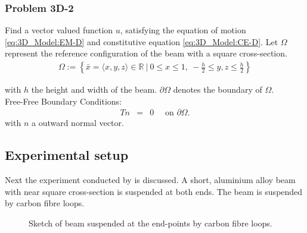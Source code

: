 \documentclass[../../main.tex]{subfiles}
\begin{document}
\subsubsection{Problem 3D-2}
Find a vector valued function $u$, satisfying the equation of motion \eqref{eq:3D_Model:EM-D} and constitutive equation \eqref{eq:3D_Model:CE-D}. Let $\Omega$ represent the reference configuration of the beam with a square cross-section.
\begin{eqnarray*}
	\Omega := \left\{ \bar{x} = \langle x,y,z \rangle \in \mathbb{R} \ | \ 0 \leq x \leq 1, \ -\frac{h}{2} \leq y, z \leq \frac{h}{2}  \right\}
\end{eqnarray*}

with $h$ the height and width of the beam. $\partial \Omega$ denotes the boundary of $\Omega$. \label{sym:height} \\

{Free-Free Boundary Conditions:}\\
\begin{eqnarray*}
	Tn & = & 0 \quad \textrm{ on } \partial\Omega.
\end{eqnarray*} with $n$ a outward normal vector.


\subsection{Experimental setup}
Next the experiment conducted by \cite{SP06} is discussed. A short, aluminium alloy beam with near square cross-section is suspended at both ends. The beam is suspended by carbon fibre loops.

\begin{figure}[h!]
	\centering
	\caption{Sketch of beam suspended at the end-points by carbon fibre loops.}
\end{figure} 
\FloatBarrier
\end{document}
